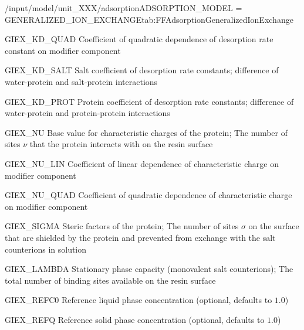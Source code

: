 \begin{condsubgroup}{/input/model/unit\_XXX/adsorption}{ADSORPTION\_MODEL = GENERALIZED\_ION\_EXCHANGE}{tab:FFAdsorptionGeneralizedIonExchange}
\begin{dataset}[unit=\si{\per\square\ModUnit},type=double,length={\texttt{NCOMP}}]{GIEX\_KD\_QUAD}
    Coefficient of quadratic dependence of desorption rate constant on modifier component
  \end{dataset}
  \begin{dataset}[type=double,length={\texttt{NCOMP}}]{GIEX\_KD\_SALT}
    Salt coefficient of desorption rate constants; difference of water-protein and salt-protein interactions
  \end{dataset}
  \begin{dataset}[unit=\si{\raiseto{3}\metre\of{MP}\per\mol}, type=double,length={\texttt{NCOMP}}]{GIEX\_KD\_PROT}
    Protein coefficient of desorption rate constants; difference of water-protein and protein-protein interactions
  \end{dataset}
  \begin{dataset}[type=double,length={\texttt{NCOMP}}]{GIEX\_NU}
    Base value for characteristic charges of the protein; The number of sites $\nu$ that the protein interacts with on the resin surface
  \end{dataset}
  \begin{dataset}[unit=\si{\per\ModUnit},type=double,length={\texttt{NCOMP}}]{GIEX\_NU\_LIN}
    Coefficient of linear dependence of characteristic charge on modifier component
  \end{dataset}
  \begin{dataset}[unit=\si{\per\square\ModUnit},type=double,length={\texttt{NCOMP}}]{GIEX\_NU\_QUAD}
    Coefficient of quadratic dependence of characteristic charge on modifier component
  \end{dataset}
  \begin{dataset}[type=double,range={$\geq 0$},length={\texttt{NCOMP}}]{GIEX\_SIGMA}
    Steric factors of the protein; The number of sites $\sigma$ on the surface that are shielded by the protein and prevented from exchange with the salt counterions in solution
  \end{dataset}
  \begin{dataset}[unit=\si{\mol\per\cubic\metre\of{SP}}, type=double,range={$\geq 0$},length={1}]{GIEX\_LAMBDA}
    Stationary phase capacity (monovalent salt counterions); The total number of binding sites available on the resin surface 
  \end{dataset}
  \begin{dataset}[unit=\si{\mol\per\raiseto{3}\metre\of{MP}}, type=double,range={$> 0$},length={1}]{GIEX\_REFC0}
    Reference liquid phase concentration (optional, defaults to $1.0$)
  \end{dataset}
  \begin{dataset}[unit=\si{\mol\per\raiseto{3}\metre\of{SP}}, type=double,range={$> 0$},length={1}]{GIEX\_REFQ}
    Reference solid phase concentration (optional, defaults to $1.0$) 
  \end{dataset}
\end{condsubgroup}


